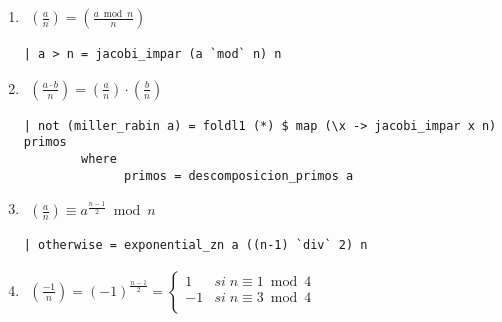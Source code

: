 \documentclass[10pt,spanish]{article}
\begin{document}
\begin{enumerate}[1.]
\item 
\begin{equation*}
    \begin{aligned}
    \left( \frac{a}{n} \right) = \left( \frac{a \bmod n}{n} \right)
    \end{aligned}
    \phantom{\hspace{12cm}}
\end{equation*}

\begin{verbatim}
| a > n = jacobi_impar (a `mod` n) n 
\end{verbatim}

\item 
\begin{equation*}
    \begin{aligned}
    \left( \frac{a \cdot b}{n} \right) = \left( \frac{a}{n} \right) \cdot \left( \frac{b}{n} \right)
    \end{aligned}
    \phantom{\hspace{12cm}}
\end{equation*}

\begin{verbatim}
| not (miller_rabin a) = foldl1 (*) $ map (\x -> jacobi_impar x n) primos
        where
              primos = descomposicion_primos a
\end{verbatim}

\item
\begin{equation*}
    \begin{aligned}
    \left( \frac{a}{n} \right) \equiv a^{\frac{n-1}{2}} \bmod n
    \end{aligned}
    \phantom{\hspace{12cm}}
\end{equation*}

\begin{verbatim}
| otherwise = exponential_zn a ((n-1) `div` 2) n
\end{verbatim}

\item
\begin{equation*}
    \begin{aligned}
    \left( \frac{-1}{n} \right) = (-1)^{\frac{n-1}{2}} = \begin{cases}
        1 & si \;n \equiv 1 \bmod 4 \\
        -1 & si \;n \equiv 3 \bmod 4\\
        \end{cases}
    \end{aligned}
    \phantom{\hspace{12cm}}
\end{equation*}


\end{enumerate}
\end{document}
